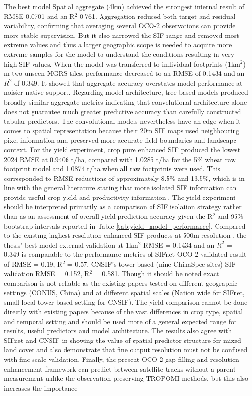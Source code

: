 The best model Spatial aggregate (4km) achieved the strongest internal result of RMSE 0.0701 and an R$^2$ 0.761. Aggregation reduced both target and residual variability, confirming that averaging several OCO-2 observations can provide more stable supervision. But it also narrowed the SIF range and removed most extreme values and thus a larger geographic scope is needed to acquire more extreme samples for the model to understand the conditions resulting in very high SIF values. When the model was transferred to individual footprints (1km$^2$) in two unseen MGRS tiles, performance decreased to an RMSE of 0.1434 and an $R^2$ of 0.349. It showed that aggregate accuracy overstates model performance at noisier native support. Regarding model architecture, tree based models produced broadly similar aggregate metrics indicating that convolutional architecture alone does not guarantee much greater predictive accuracy than carefully constructed tabular predictors. The convolutional models nevertheless have an edge when it comes to spatial representation because their 20m SIF maps used neighbouring pixel information and preserved more accurate field boundaries and landscape context. For the yield experiment, crop pure enhanced SIF produced the lowest 2024 RMSE at 0.9406 t/ha, compared with 1.0285 t/ha for the 5\% wheat raw footprint model and 1.0874 t/ha when all raw footprints were used. This corresponded to RMSE reductions of approximately 8.5\% and 13.5\%, which is in line with the general literature stating that more isolated SIF information can provide useful crop yield and productivity information \cite{peng2020assessing,song2018satellite,qiu2022monitoring}. The yield experiment should be interpreted primarily as a comparison of SIF isolation strategy rather than as an assessment of overall yield prediction accuracy given the R$^2$ and 95\% bootstrap intervals reported in Table \ref{tab:yield_model_performance}. Compared to the existing highest resolution enhanced SIF products at 500m resolution \cite{gensheimer2022convolutional,du2025cnsif}, the thesis' best model external validation at 1km$^2$ RMSE = 0.1434 and an $R^2$ = 0.349 is comparable to the performance metrics of SIFnet OCO-2 validated result of RMSE = 0.19, R$^2$ = 0.57, CNSIF's tower based (nine ChinaSpec sites) SIF validation RMSE = 0.152, R$^2$ = 0.581. Though it should be noted exact comparison is not reliable as the existing papers tested on different geographic settings (CONUS, China) and at different spatial scales (Nation wide for SIFnet, small local tower based setting for CNSIF). The yield comparison cannot be done directly with existing papers because of the vast differences in crop type, spatial and temporal setting and should be used more of a general expected range for results, useful predictors and model architecture. The results also agree with SIFnet and CNSIF \cite{gensheimer2022convolutional,du2025cnsif} in showing the value of spatial predictor structure for mixed land cover and also demonstrate that fine output resolution must not be confused with fine scale validation. Finally, the present OCO-2 gap filling and resolution enhancement framework can predict between satellite tracks without a parent measurement unlike the observation preserving TROPOMI methods, but this also increases the importance 